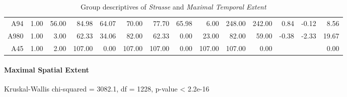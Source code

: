 \begin{table}[ht!]
\begin{tabular}{rrrrrrrrrrrrrr}
    A94  & 1.00 & 56.00 & 84.98 & 64.07 & 70.00 & 77.70 & 65.98 & 6.00 & 248.00 & 242.00 & 0.84 & -0.12 & 8.56 \\ 
    A980 & 1.00 & 3.00 & 62.33 & 34.06 & 82.00 & 62.33 & 0.00 & 23.00 & 82.00 & 59.00 & -0.38 & -2.33 & 19.67 \\ 
    A45  & 1.00 & 2.00 & 107.00 & 0.00 & 107.00 & 107.00 & 0.00 & 107.00 & 107.00 & 0.00 &  &  & 0.00 \\ 
    \hline
  \end{tabular}
	\caption{Group descriptives of \textit{Strasse} and \textit{Maximal Temporal Extent}}
	\label{tbl:descriptives_baysis_matched_Strasse_TMax}
\end{table}

\paragraph{Maximal Spatial Extent}
Kruskal-Wallis chi-squared = 3082.1, df = 1228, p-value < 2.2e-16

